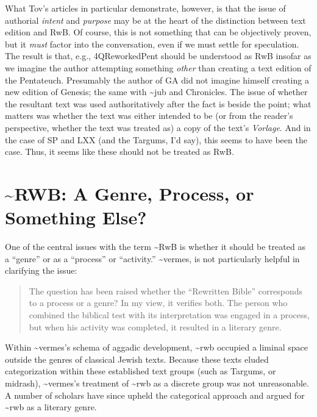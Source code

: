 What Tov's articles in particular demonstrate, however, is that the
issue of authorial \emph{intent} and \emph{purpose} may be at the heart
of the distinction between text edition and RwB. Of course, this is not
something that can be objectively proven, but it \emph{must} factor into
the conversation, even if we must settle for speculation. The result is
that, e.g., 4QReworkedPent should be understood as RwB insofar as we
imagine the author attempting something \emph{other} than creating a
text edition of the Pentateuch. Presumably the author of GA did not
imagine himself creating a new edition of Genesis; the same with
\textasciitilde{}jub and Chronicles. The issue of whether the resultant
text was used authoritatively after the fact is beside the point; what
matters was whether the text was either intended to be (or from the
reader's perspective, whether the text was treated as) a copy of the
text's \emph{Vorlage}. And in the case of SP and LXX (and the Targums,
I'd say), this seems to have been the case. Thus, it seems like these
should not be treated as RwB.

\hypertarget{rwb-a-genre-process-or-something-else}{%
\section{\textasciitilde{}RWB: A Genre, Process, or Something
Else?}\label{rwb-a-genre-process-or-something-else}}

One of the central issues with the term \textasciitilde{}RwB is whether
it should be treated as a ``genre'' or as a ``process'' or ``activity.''
\textasciitilde{}vermes, is not particularly helpful in clarifying the
issue:

\begin{quote}
The question has been raised whether the ``Rewritten Bible'' corresponds
to a process or a genre? In my view, it verifies both. The person who
combined the biblical test with its interpretation was engaged in a
process, but when his activity was completed, it resulted in a literary
genre.\autocite[8]{vermes_zsengeller2014}
\end{quote}

Within \textasciitilde{}vermes's schema of aggadic development,
\textasciitilde{}rwb occupied a liminal space outside the genres of
classical Jewish texts. Because these texts eluded categorization within
these established text groups (such as Targums, or midrash),
\textasciitilde{}vermes's treatment of \textasciitilde{}rwb as a
discrete group was not unreasonable. A number of scholars have since
upheld the categorical approach and argued for \textasciitilde{}rwb as a
literary genre.

